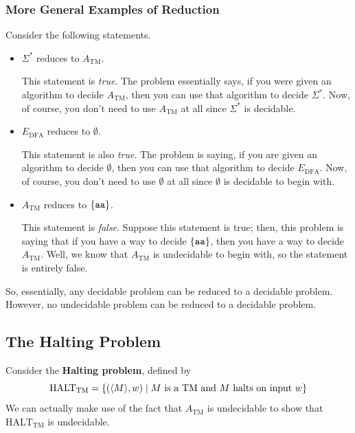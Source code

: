 \documentclass[letterpaper]{article}
\begin{document}
\subsubsection{More General Examples of Reduction}
Consider the following statements. 
\begin{itemize}
    \item $\Sigma^*$ reduces to $A_{\text{TM}}$.
    \begin{mdframed}[]
        This statement is \emph{true}. The problem essentially says, if you were given an algorithm to decide $A_{\text{TM}}$, then you can use that algorithm to decide $\Sigma^*$. Now, of course, you don't need to use $A_{\text{TM}}$ at all since $\Sigma^*$ is decidable. 
    \end{mdframed}
    \item $E_{\text{DFA}}$ reduces to $\emptyset$.
    \begin{mdframed}[]
        This statement is also \emph{true}. The problem is saying, if you are given an algorithm to decide $\emptyset$, then you can use that algorithm to decide $E_{\text{DFA}}$. Now, of course, you don't need to use $\emptyset$ at all since $\emptyset$ is decidable to begin with.  
    \end{mdframed}
    \item $A_{\text{TM}}$ reduces to $\{\texttt{aa}\}$.
    \begin{mdframed}[]
        This statement is \emph{false}. Suppose this statement is true; then, this problem is saying that if you have a way to decide $\{\texttt{aa}\}$, then you have a way to decide $A_{\text{TM}}$. Well, we know that $A_{\text{TM}}$ is undecidable to begin with, so the statement is entirely false. 
    \end{mdframed}
\end{itemize}
So, essentially, any decidable problem can be reduced to a decidable problem. However, no undecidable problem can be reduced to a decidable problem. 

\subsection{The Halting Problem}
Consider the \textbf{Halting problem}, defined by 
\[\text{HALT}_{\text{TM}} = \{(\langle M \rangle, w) \mid M \text{ is a TM and } M \text{ halts on input } w\}\]
We can actually make use of the fact that $A_{\text{TM}}$ is undecidable to show that $\text{HALT}_{\text{TM}}$ is undecidable.
\end{document}
